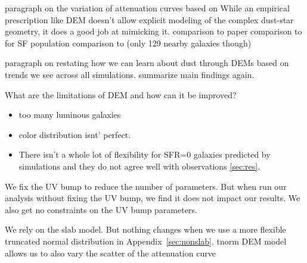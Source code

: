 

paragraph on the variation of attenuation curves based on 
While an empirical prescription like DEM doesn't allow explicit modeling of the
complex dust-star geometry, it does a good job at mimicking it. 
comparison to \cite{narayanan2018} paper 
comparison to \cite{salim2018} for SF population  
comparison to \cite{leja2017} (only 129 nearby galaxies though) 


paragraph on restating how we can learn about dust through DEMs based on trends we see
across all simulations. summarize main findings again. 

What are the limitations of DEM and how can it be improved? 
\begin{itemize}
    \item too many luminous galaxies
    \item color distribution isnt' perfect. 
    \item There isn't a whole lot of flexibility for SFR=0 galaxies predicted by
    simulations and they do not agree well with observations \ref{sec:res}. 
\end{itemize}


We fix the UV bump to reduce the number of parameters. But when run our
analysis without fixing the UV bump, we find it does not impact our results.
We also get no constraints on the UV bump parameters. 

We rely on the slab model. But nothing changes when we use a more flexible
truncated normal distribution in Appendix~\ref{sec:nonslab}. tnorm DEM model allows us to also vary the
scatter of the attenuation curve 


